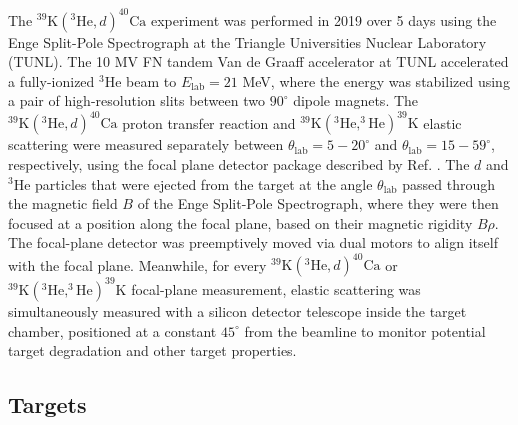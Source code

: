 
The $^{39}\mathrm{K}(^{3}\mathrm{He}, d)^{40}\mathrm{Ca}$ experiment was performed in 2019 over 5 days using the Enge Split-Pole Spectrograph at the Triangle Universities Nuclear Laboratory (TUNL). The 10 MV FN tandem Van de Graaff accelerator at TUNL accelerated a fully-ionized $^{3}$He beam to  $E_{\mathrm{lab}} = 21$ MeV, where the energy was stabilized using a pair of high-resolution slits between two $90^{\circ}$ dipole magnets. The $^{39}\mathrm{K}(^{3}\mathrm{He},d)^{40}\mathrm{Ca}$ proton transfer reaction and $^{39}\mathrm{K}(^{3}\mathrm{He},^{3}\mathrm{He})^{39}\mathrm{K}$ elastic scattering were measured separately between $\theta_{\mathrm{lab}} = 5-20^{\circ}$ and $ \theta_{\mathrm{lab}} = 15-59^{\circ}$, respectively, using the focal plane detector package described by Ref. \cite{Marshall2019}. The $d$ and $^{3}$He particles that were ejected from the target at the angle $\theta_{\mathrm{lab}}$ passed through the magnetic field $B$ of the Enge Split-Pole Spectrograph, where they were then focused at a position along the focal plane, based on their magnetic rigidity $B\rho$. The focal-plane detector was preemptively moved via dual motors to align itself with the focal plane. Meanwhile, for every $^{39}\mathrm{K}(^{3}\mathrm{He},d)^{40}\mathrm{Ca}$ or $^{39}\mathrm{K}(^{3}\mathrm{He},^{3}\mathrm{He})^{39}\mathrm{K}$ focal-plane measurement, elastic scattering was simultaneously measured with a silicon detector telescope inside the target chamber, positioned at a constant $45^{\circ}$ from the beamline to monitor potential target degradation and other target properties.

\subsection{Targets}

